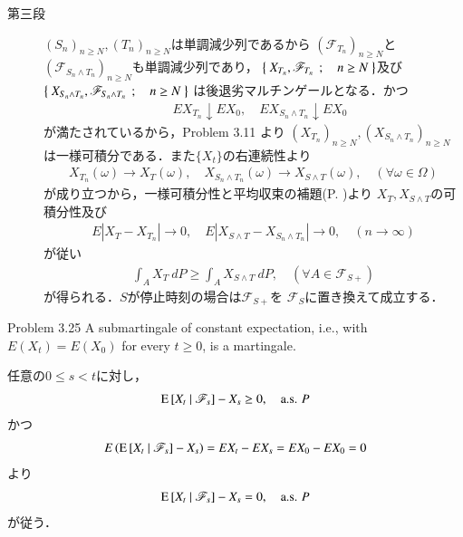 \begin{prf}
\begin{description}
			\item[第三段]
				$(S_n)_{n \geq N},(T_n)_{n \geq N}$は単調減少列であるから
				$\left( \mathscr{F}_{T_n} \right)_{n \geq N}$と
				$\left( \mathscr{F}_{S_n \wedge T_n} \right)_{n \geq N}$も単調減少列であり，
				$\left\{\ X_{T_n},\mathscr{F}_{T_n}\ \, ; \quad n \geq N\ \right\}$及び
				$\left\{\ X_{S_n \wedge T_n},\mathscr{F}_{S_n \wedge T_n}\ \, ; \quad n \geq N\ \right\}$
				は後退劣マルチンゲールとなる．かつ
				\begin{align}
					\quad EX_{T_n} \downarrow EX_0,
					\quad EX_{S_n \wedge T_n} \downarrow EX_0
				\end{align}
				が満たされているから，Problem 3.11 より
				$\left( X_{T_n} \right)_{n \geq N},\left( X_{S_n \wedge T_n} \right)_{n \geq N}$
				は一様可積分である．また$\{X_t\}$の右連続性より
				\begin{align}
					X_{T_n}(\omega) \longrightarrow X_T(\omega),
					\quad X_{S_n \wedge T_n}(\omega) \longrightarrow X_{S \wedge T}(\omega),
					\quad (\forall \omega \in \Omega)
				\end{align}
				が成り立つから，一様可積分性と平均収束の補題(P. \pageref{lem:uniformly_integrable_and_convergence_in_mean})より
				$X_T,X_{S \wedge T}$の可積分性及び
				\begin{align}
					E\left| X_T - X_{T_n} \right| \longrightarrow 0,
					\quad E\left| X_{S \wedge T} - X_{S_n \wedge T_n} \right| \longrightarrow 0,
					\quad (n \longrightarrow \infty)
				\end{align}
				が従い
				\begin{align}
					\int_A X_T\ dP \geq \int_A X_{S \wedge T}\ dP,
					\quad (\forall A \in \mathscr{F}_{S+})
				\end{align}
				が得られる．$S$が停止時刻の場合は$\mathscr{F}_{S+}$を
				$\mathscr{F}_S$に置き換えて成立する．
				\QED
		\end{description}
	\end{prf}
	
	\begin{itembox}[l]{Problem 3.25}
		A submartingale of constant expectation, i.e., with $E(X_t) = E(X_0)$ for every $t \geq 0$, is a martingale. 
	\end{itembox}
	
	\begin{prf}
		任意の$0 \leq s < t$に対し，
		\begin{align}
			\operatorname{E} \left[ X_t \ \middle|\ \mathscr{F}_s \right] - X_s \geq 0,
			\quad \mbox{a.s. $P$}
		\end{align}
		かつ
		\begin{align}
			E\left( \operatorname{E} \left[ X_t \ \middle|\ \mathscr{F}_s \right] - X_s \right)
			= EX_t - EX_s
			= EX_0 - EX_0
			= 0
		\end{align}
		より
		\begin{align}
			\operatorname{E} \left[ X_t \ \middle|\ \mathscr{F}_s \right] - X_s = 0,
			\quad \mbox{a.s. $P$}
		\end{align}
		が従う．
		\QED
	\end{prf}
	
